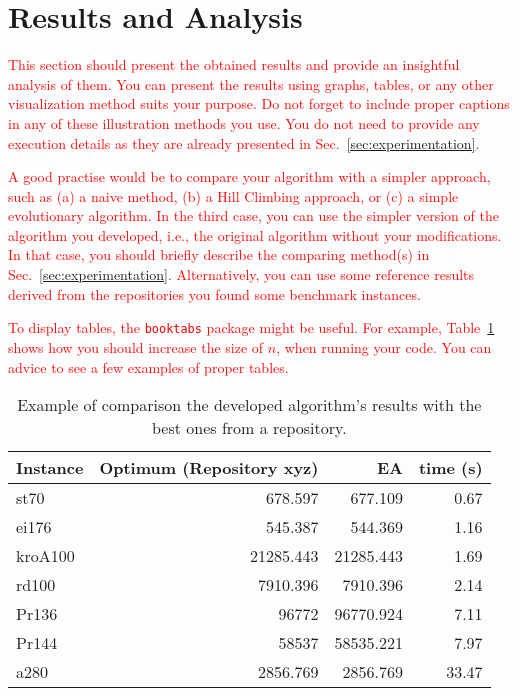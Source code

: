 \documentclass{scrartcl}
\begin{document}
\lipsum[4]


\section{Results and Analysis}
\label{sec:results-analysis}

\textcolor{red}{This section should present the obtained results and provide an insightful analysis of them. You can present the results using graphs, tables, or any other visualization method suits your purpose. Do not forget to include proper captions \cite{zobel2014graphs} in any of these illustration methods you use. You do not need to provide any execution details as they are already presented in Sec.~\ref{sec:experimentation}.}

\textcolor{red}{A good practise would be to compare your algorithm with a simpler approach, such as (a) a naive method, (b) a Hill Climbing approach, or (c) a simple evolutionary algorithm. In the third case, you can use the simpler version of the algorithm you developed, i.e., the original algorithm without your modifications. In that case, you should briefly describe the comparing method(s) in Sec.~\ref{sec:experimentation}. Alternatively, you can use some reference results derived from the repositories you found some benchmark instances.}

\textcolor{red}{To display tables, the \texttt{booktabs} package might be useful. For example, Table~\ref{tab:results_example} shows how you should increase the  size of $n$, when running your code. You can advice \cite{zobel2014graphs} to see a few examples of proper tables.}

\begin{table}[h]
\centering
\caption{Example of comparison the developed algorithm's results with the best ones from a repository.}
\label{tab:results_example}
	\begin{tabular}{lrrr}
	\toprule
	\textbf{Instance} & \textbf{Optimum (Repository xyz)} & \textbf{EA} & \textbf{time (s)}\\
	\midrule
	st70       &  678.597      & 677.109	& 0.67\\
	ei176      &  545.387      & 544.369	& 1.16\\
	kroA100    &  21285.443    & 21285.443	& 1.69\\
	rd100      &  7910.396     & 7910.396	& 2.14\\
	Pr136      &  96772        & 96770.924	& 7.11\\
	Pr144      &  58537        & 58535.221	& 7.97\\
	a280       &  2856.769     & 2856.769	& 33.47\\
	\bottomrule
	\end{tabular}
\end{table}
\end{document}
